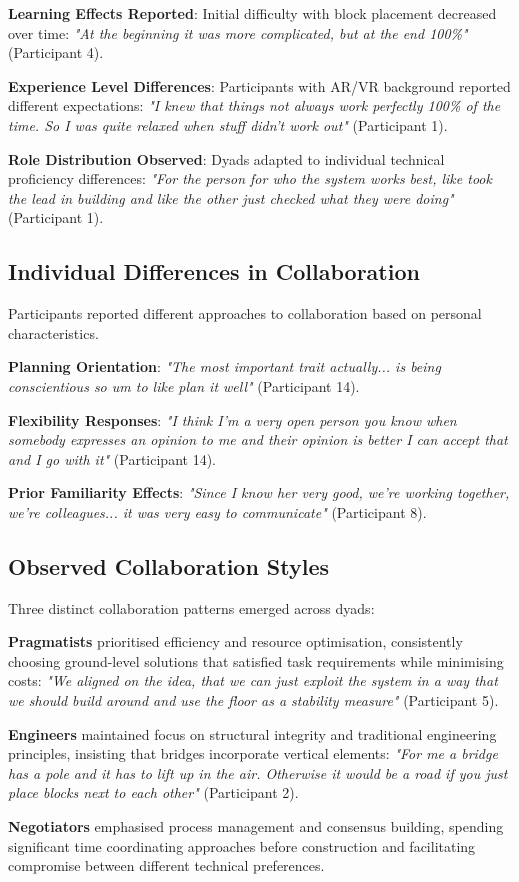 \textbf{Learning Effects Reported}: Initial difficulty with block placement decreased over time: \textit{"At the beginning it was more complicated, but at the end 100\%"} (Participant 4).

\textbf{Experience Level Differences}: Participants with AR/VR background reported different expectations: \textit{"I knew that things not always work perfectly 100\% of the time. So I was quite relaxed when stuff didn't work out"} (Participant 1).

\textbf{Role Distribution Observed}: Dyads adapted to individual technical proficiency differences: \textit{"For the person for who the system works best, like took the lead in building and like the other just checked what they were doing"} (Participant 1).

\subsection{Individual Differences in Collaboration}

Participants reported different approaches to collaboration based on personal characteristics.

\textbf{Planning Orientation}: \textit{"The most important trait actually... is being conscientious so um to like plan it well"} (Participant 14).

\textbf{Flexibility Responses}: \textit{"I think I'm a very open person you know when somebody expresses an opinion to me and their opinion is better I can accept that and I go with it"} (Participant 14).

\textbf{Prior Familiarity Effects}: \textit{"Since I know her very good, we're working together, we're colleagues... it was very easy to communicate"} (Participant 8).

\subsection{Observed Collaboration Styles}

Three distinct collaboration patterns emerged across dyads:

\textbf{Pragmatists} prioritised efficiency and resource optimisation, consistently choosing ground-level solutions that satisfied task requirements while minimising costs: \textit{"We aligned on the idea, that we can just exploit the system in a way that we should build around and use the floor as a stability measure"} (Participant 5).

\textbf{Engineers} maintained focus on structural integrity and traditional engineering principles, insisting that bridges incorporate vertical elements: \textit{"For me a bridge has a pole and it has to lift up in the air. Otherwise it would be a road if you just place blocks next to each other"} (Participant 2).

\textbf{Negotiators} emphasised process management and consensus building, spending significant time coordinating approaches before construction and facilitating compromise between different technical preferences.



